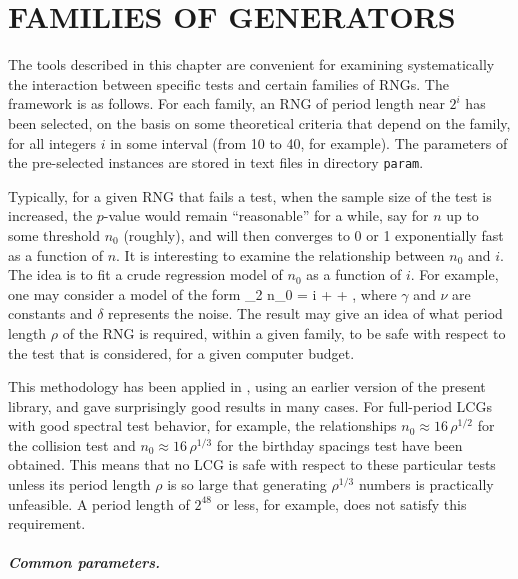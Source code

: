 \chapter {FAMILIES OF GENERATORS}

\def\eps  {$\epsilon\quad$}
\def\epsm  {--$\epsilon_1\quad$}

The tools described in this chapter are convenient for examining
systematically the interaction between specific tests
and certain families of RNGs. 
The framework is as follows.
For each family, an RNG of period length near $2^i$ has been selected,
on the basis on some theoretical criteria
that depend on the family, for all integers $i$ in some interval
(from 10 to 40, for example).
The parameters of the pre-selected instances are stored in text files
in directory {\tt param}.

Typically, for a given RNG that fails a test, when the
sample size of the test is increased, the $p$-value would remain
``reasonable'' for a while, say  for $n$ up to some 
threshold $n_0$ (roughly), and will then converges to 0 or 1 exponentially 
fast as a function of $n$.
It is interesting to examine the relationship between $n_0$ and $i$.
The idea is to fit a crude regression model of $n_0$ as a function
of $i$.  For example, one may consider a model of the form
\eq
  \log_2 n_0 = \gamma i + \nu + \delta,
\endeq
where $\gamma$ and $\nu$ are constants and $\delta$ represents
the noise. The result may give an idea of what period length $\rho$
of the RNG is required, within a given family, to be safe with respect
to the test that is considered, for a given computer budget.

This methodology has been applied in 
\cite{rGRA01a,rLEC98h,rLEC00c,rLEC01a,rLEC02c,rLEC03c},
using an earlier version of the present library,
and gave surprisingly good results in many cases.
For full-period LCGs with good spectral test behavior, for example, 
the relationships $n_0 \approx 16\,\rho^{1/2}$
for the collision test and $n_0 \approx 16\,\rho^{1/3}$
for the birthday spacings test have been obtained.
This means that no LCG is safe with respect to these particular tests
unless its period length $\rho$ is so large that generating 
$\rho^{1/3}$ numbers is practically unfeasible.  
A period length of $2^{48}$ or less, for example, does not satisfy
this requirement.


\paragraph*{Common parameters.} \


